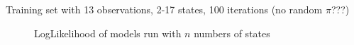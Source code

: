 \documentclass{article}
\begin{document}
Training set with 13 observations, 2-17 states, 100 iterations (no random $\pi$???)
\begin{figure}[h]\centering
{}
\caption{LogLikelihood of models run with $n$ numbers of states}\label{lap}
\end{figure}

\printbibliography
\end{document}
